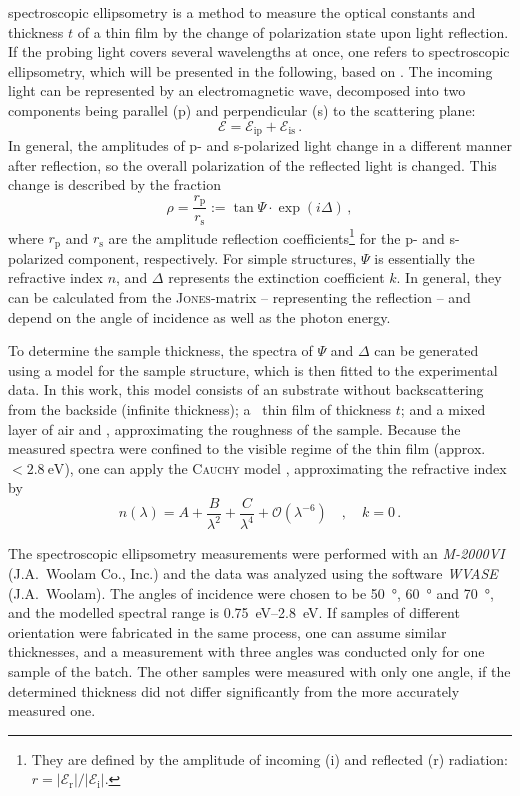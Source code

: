spectroscopic ellipsometry is a method to measure the optical constants and thickness $t$ of a thin film by the change of polarization state upon light reflection.
If the probing light covers several wavelengths at once, one refers to spectroscopic ellipsometry, which will be presented in the following, based on \textcite{fujiwara2007}.
The incoming light can be represented by an electromagnetic wave, decomposed into two components being parallel (p) and perpendicular (s) to the scattering plane:
\begin{equation}
    \mathcal{E} = \mathcal{E}_\mathrm{ip} + \mathcal{E}_\mathrm{is}\,.
\end{equation}
In general, the amplitudes of p- and s-polarized light change in a different manner after reflection, so the overall polarization of the reflected light is changed.
This change is described by the fraction
\begin{equation}
    \rho=\frac{r_\mathrm{p}}{r_\mathrm{s}}:=\tan\Psi\cdot\exp(i\Delta)\,,
\end{equation}
where $r_\mathrm{p}$ and $r_\mathrm{s}$ are the amplitude reflection coefficients\footnote{
    They are defined by the amplitude of incoming (i) and reflected (r) radiation: $r=|\mathcal{E}_\mathrm{r}|/|\mathcal{E}_\mathrm{i}|$.
} for the p- and s-polarized component, respectively.
For simple structures, $\Psi$ is essentially the refractive index $n$, and $\Delta$ represents the extinction coefficient $k$.
In general, they can be calculated from the \textsc{Jones}-matrix -- representing the reflection -- and depend on the angle of incidence as well as the photon energy.

To determine the sample thickness, the spectra of $\Psi$ and $\Delta$ can be generated using a model for the sample structure, which is then fitted to the experimental data.
In this work, this model consists of an  substrate without backscattering from the backside (infinite thickness); a \cro\ thin film of thickness $t$; and a mixed layer of air and \cro, approximating the roughness of the sample.
Because the measured spectra were confined to the visible regime of the thin film (approx. $<\qty{2.8}{\eV}$), one can apply the \textsc{Cauchy} model
    \cite{fujiwara2007},
approximating the refractive index by
\begin{equation}
    n(\lambda)=A+\frac{B}{\lambda^2}+\frac{C}{\lambda^4}+\mathcal{O}\left(\lambda^{-6}\right)\quad,\quad k=0\,.
\end{equation}

The spectroscopic ellipsometry measurements were performed with an \textit{M-2000VI} (J.A.\ Woolam Co., Inc.) and the data was analyzed using the software \textit{WVASE} (J.A.\ Woolam).
The angles of incidence were chosen to be \qty{50}{\degree}, \qty{60}{\degree} and \qty{70}{\degree}, and the modelled spectral range is \qtyrange{0.75}{2.8}{\eV}.
If samples of different orientation were fabricated in the same process, one can assume similar thicknesses, and a measurement with three angles was conducted only for one sample of the batch.
The other samples were measured with only one angle, if the determined thickness did not differ significantly from the more accurately measured one.

